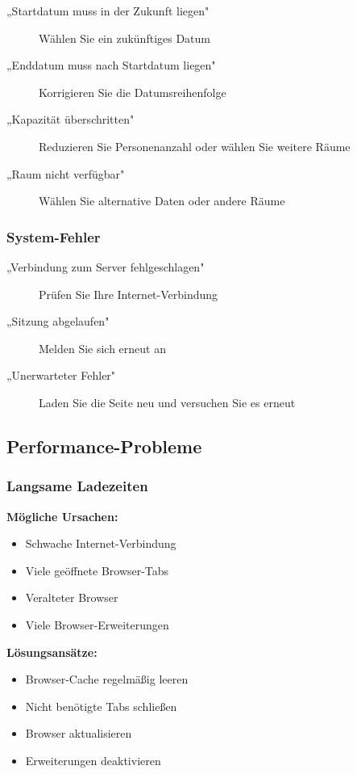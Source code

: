 \begin{description}
    \item[„Startdatum muss in der Zukunft liegen"] Wählen Sie ein zukünftiges Datum
    \item[„Enddatum muss nach Startdatum liegen"] Korrigieren Sie die Datumsreihenfolge
    \item[„Kapazität überschritten"] Reduzieren Sie Personenanzahl oder wählen Sie weitere Räume
    \item[„Raum nicht verfügbar"] Wählen Sie alternative Daten oder andere Räume
\end{description}

\subsubsection{System-Fehler}

\begin{description}
    \item[„Verbindung zum Server fehlgeschlagen"] Prüfen Sie Ihre Internet-Verbindung
    \item[„Sitzung abgelaufen"] Melden Sie sich erneut an
    \item[„Unerwarteter Fehler"] Laden Sie die Seite neu und versuchen Sie es erneut
\end{description}

\subsection{Performance-Probleme}

\subsubsection{Langsame Ladezeiten}

\textbf{Mögliche Ursachen:}

\begin{itemize}
    \item Schwache Internet-Verbindung
    \item Viele geöffnete Browser-Tabs
    \item Veralteter Browser
    \item Viele Browser-Erweiterungen
\end{itemize}

\textbf{Lösungsansätze:}

\begin{itemize}
    \item Browser-Cache regelmäßig leeren
    \item Nicht benötigte Tabs schließen
    \item Browser aktualisieren
    \item Erweiterungen deaktivieren
\end{itemize}

